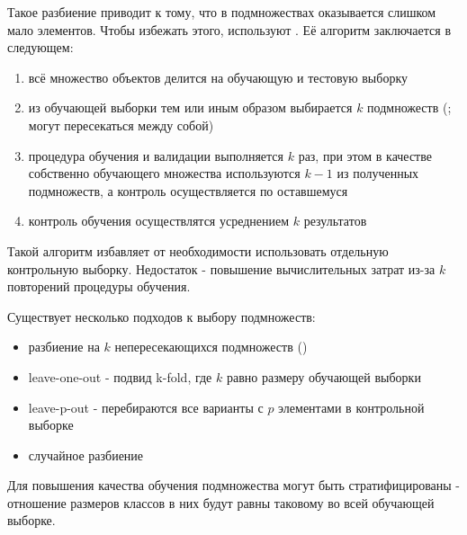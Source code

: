 Такое разбиение приводит к тому, что в подмножествах оказывается слишком мало элементов. Чтобы избежать этого, используют . Её алгоритм заключается в следующем:

\begin{enumerate}
\item всё множество объектов делится на обучающую и тестовую выборку
\item из обучающей выборки тем или иным образом выбирается $k$ подмножеств (; могут пересекаться между собой)
\item процедура обучения и валидации выполняется $k$ раз, при этом в качестве собственно обучающего множества используются $k-1$ из полученных подмножеств, а контроль осуществляется по оставшемуся
\item контроль обучения осуществлятся усреднением $k$ результатов
\end{enumerate}

Такой алгоритм избавляет от необходимости использовать отдельную контрольную выборку. Недостаток - повышение вычислительных затрат из-за $k$ повторений процедуры обучения.

Существует несколько подходов к выбору подмножеств:

\begin{itemize}
\item разбиение на $k$ непересекающихся подмножеств ()
\item leave-one-out - подвид k-fold, где $k$ равно размеру обучающей выборки
\item leave-p-out - перебираются все варианты с $p$ элементами в контрольной выборке
\item случайное разбиение
\end{itemize}

Для повышения качества обучения подмножества могут быть стратифицированы - отношение размеров классов в них будут равны таковому во всей обучающей выборке.

